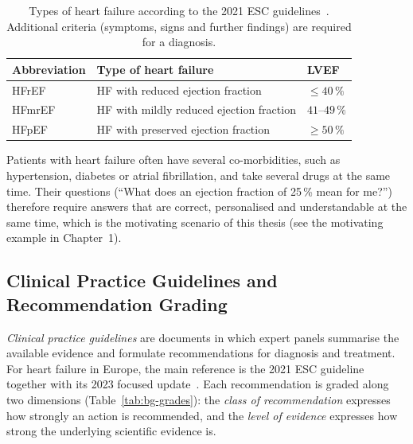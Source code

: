 \begin{table}[htbp]
  \centering
  \begin{tabular}{@{}lll@{}}
    \toprule
    \textbf{Abbreviation} & \textbf{Type of heart failure} & \textbf{LVEF} \\
    \midrule
    HFrEF  & HF with reduced ejection fraction       & $\leq 40\,\%$ \\
    HFmrEF & HF with mildly reduced ejection fraction & $41$--$49\,\%$ \\
    HFpEF  & HF with preserved ejection fraction      & $\geq 50\,\%$ \\
    \bottomrule
  \end{tabular}
  \caption{Types of heart failure according to the 2021 ESC
  guidelines~\cite{mcdonagh2021esc}. Additional criteria (symptoms, signs and
  further findings) are required for a diagnosis.}
  \label{tab:bg-hf-types}
\end{table}

Patients with heart failure often have several co-morbidities, such as
hypertension, diabetes or atrial fibrillation, and take several drugs at the
same time. Their questions (``What does an ejection fraction of 25\,\% mean
for me?'') therefore require answers that are correct, personalised and
understandable at the same time, which is the motivating scenario of this
thesis (see the motivating example in Chapter~1).

\subsection{Clinical Practice Guidelines and Recommendation Grading}
\label{sec:bg-guidelines}

\emph{Clinical practice guidelines} are documents in which expert panels
summarise the available evidence and formulate recommendations for diagnosis
and treatment. For heart failure in Europe, the main reference is the 2021
ESC guideline~\cite{mcdonagh2021esc} together with its 2023 focused
update~\cite{mcdonagh2023focused}. Each recommendation is graded along two
dimensions (Table~\ref{tab:bg-grades}): the \emph{class of recommendation}
expresses how strongly an action is recommended, and the \emph{level of
evidence} expresses how strong the underlying scientific evidence is.

